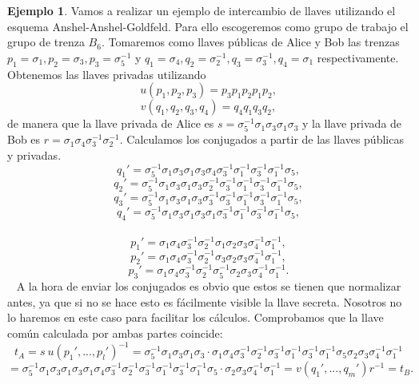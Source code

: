 \documentclass[12pt]{book}
\theoremstyle{definition}
\newtheorem{ejem}{Ejemplo}[section]
\begin{document}
\begin{ejem}
Vamos a realizar un ejemplo de intercambio de llaves utilizando el esquema Anshel-Anshel-Goldfeld. Para ello escogeremos como grupo de trabajo el grupo de trenza $B_6$. Tomaremos como llaves públicas de Alice y Bob las trenzas $p_1 = \sigma_1, p_2 = \sigma_3, p_3 =\sigma_5^{-1}$ y $q_1 = \sigma_4, q_2 = \sigma_2^{-1}, q_3 = \sigma_3^{-1}, q_4 = \sigma_1$ respectivamente. Obtenemos las llaves privadas utilizando
$$u(p_1,p_2,p_3)= p_3p_1p_2p_1p_2,$$
$$v(q_1,q_2,q_3,q_4)= q_4q_1q_3q_2,$$
de manera que la llave privada de Alice es $s=\sigma_5^{-1}\sigma_1\sigma_3\sigma_1\sigma_3$ y la llave privada de Bob es $r = \sigma_1\sigma_4\sigma_3^{-1}\sigma_2^{-1}$. Calculamos los conjugados a partir de las llaves públicas y privadas.
$$q_1' = \sigma_5^{-1}\sigma_1\sigma_3\sigma_1\sigma_3 \sigma_4 \sigma_3^{-1}\sigma_1^{-1}\sigma_3^{-1}\sigma_1^{-1}\sigma_5,$$
$$q_2' = \sigma_5^{-1}\sigma_1\sigma_3\sigma_1\sigma_3 \sigma_2^{-1} \sigma_3^{-1}\sigma_1^{-1}\sigma_3^{-1}\sigma_1^{-1}\sigma_5,$$
$$q_3' = \sigma_5^{-1}\sigma_1\sigma_3\sigma_1\sigma_3 \sigma_3^{-1} \sigma_3^{-1}\sigma_1^{-1}\sigma_3^{-1}\sigma_1^{-1}\sigma_5,$$
$$q_4' = \sigma_5^{-1}\sigma_1\sigma_3\sigma_1\sigma_3 \sigma_1 \sigma_3^{-1}\sigma_1^{-1}\sigma_3^{-1}\sigma_1^{-1}\sigma_5,$$
\ 
\newline
$$p_1' = \sigma_1\sigma_4\sigma_3^{-1}\sigma_2^{-1} \sigma_1 \sigma_2\sigma_3\sigma_4^{-1}\sigma_1^{-1},$$
$$p_2' = \sigma_1\sigma_4\sigma_3^{-1}\sigma_2^{-1} \sigma_3 \sigma_2\sigma_3\sigma_4^{-1}\sigma_1^{-1},$$
$$p_3' = \sigma_1\sigma_4\sigma_3^{-1}\sigma_2^{-1} \sigma_5^{-1} \sigma_2\sigma_3\sigma_4^{-1}\sigma_1^{-1}.$$
\ 
\newline
A la hora de enviar los conjugados es obvio que estos se tienen que normalizar antes, ya que si no se hace esto es fácilmente visible la llave secreta. Nosotros no lo haremos en este caso para facilitar los cálculos. Comprobamos que la llave común calculada por ambas partes coincide:
$$t_A = s\ u(p_1',...,p_l')^{-1} = \sigma_5^{-1}\sigma_1\sigma_3\sigma_1\sigma_3\cdot\sigma_1\sigma_4\sigma_3^{-1}\sigma_2^{-1} \sigma_3^{-1} \sigma_1^{-1}\sigma_3^{-1} \sigma_1^{-1}\sigma_5 \sigma_2\sigma_3\sigma_4^{-1}\sigma_1^{-1}$$
$$=\sigma_5^{-1}\sigma_1\sigma_3\sigma_1\sigma_3\sigma_1\sigma_4\sigma_3^{-1}\sigma_2^{-1} \sigma_3^{-1} \sigma_1^{-1}\sigma_3^{-1} \sigma_1^{-1}\sigma_5 \cdot\sigma_2\sigma_3\sigma_4^{-1}\sigma_1^{-1}=v(q_1',...,q_m')r^{-1} = t_B.$$

\end{ejem}
\end{document}
